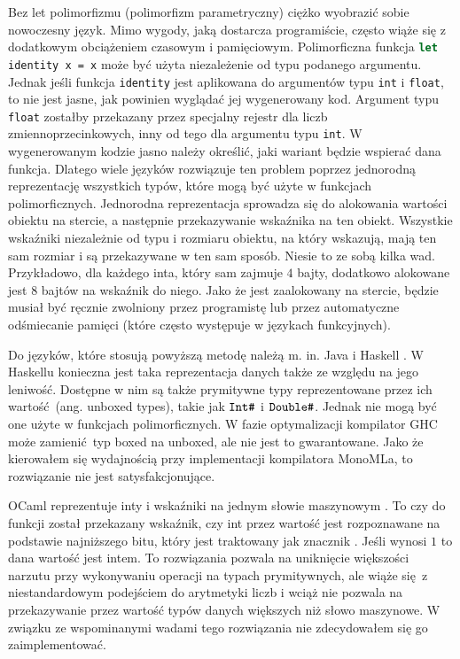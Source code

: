 \documentclass[declaration,shortabstract]{iithesis}
\begin{document}
Bez let polimorfizmu (polimorfizm parametryczny) ciężko wyobrazić sobie 
nowoczesny język. 
Mimo wygody, jaką dostarcza programiście, często wiąże się z dodatkowym
obciążeniem czasowym i pamięciowym. Polimorficzna funkcja  \newline
\lstinline[language=Caml]!let identity x = x! może być użyta niezależenie
od typu podanego argumentu. Jednak jeśli funkcja \texttt{identity} 
jest aplikowana do argumentów typu \texttt{int} i \texttt{float}, to nie jest 
jasne, jak powinien wyglądać jej wygenerowany kod. Argument typu \texttt{float}
zostałby przekazany przez specjalny rejestr dla liczb zmiennoprzecinkowych, 
inny od tego dla argumentu typu \texttt{int}. W wygenerowanym kodzie jasno
należy określić, jaki wariant będzie wspierać dana funkcja. Dlatego wiele 
języków rozwiązuje ten problem poprzez jednorodną reprezentację wszystkich 
typów, które mogą być użyte w funkcjach polimorficznych. Jednorodna 
reprezentacja sprowadza się do alokowania wartości obiektu na stercie, a 
następnie przekazywanie wskaźnika na ten obiekt. Wszystkie wskaźniki 
niezależnie od typu i rozmiaru obiektu, na który wskazują, mają ten sam 
rozmiar i są przekazywane w ten sam sposób. Niesie to ze sobą kilka wad.
Przykładowo, dla każdego inta, który sam zajmuje $4$ bajty,
dodatkowo alokowane jest $8$ bajtów na wskaźnik do niego. Jako że jest 
zaalokowany na stercie, będzie musiał być ręcznie zwolniony przez programistę 
lub przez automatyczne odśmiecanie pamięci (które często występuje w językach 
funkcyjnych).

 
Do języków, które stosują powyższą metodę należą m. in. Java 
\cite{type_erasure} i Haskell 
\cite[Haskell implementation]{haskell_poly}.
W Haskellu konieczna jest taka reprezentacja danych także ze względu na jego 
leniwość. Dostępne w nim są także prymitywne typy reprezentowane przez 
ich wartość (ang. unboxed types), takie jak $\verb!Int#!$ i 
$\verb!Double#!$. Jednak nie mogą być one użyte w funkcjach polimorficznych. 
W fazie optymalizacji kompilator GHC może zamienić typ boxed 
na unboxed, ale nie jest to gwarantowane. Jako że kierowałem się wydajnością
przy implementacji kompilatora MonoMLa, to rozwiązanie nie jest 
satysfakcjonujące.

OCaml reprezentuje inty i wskaźniki na jednym słowie 
maszynowym \cite{levity_polymorphism}. 
To czy do funkcji został przekazany wskaźnik, czy int
przez wartość jest rozpoznawane na podstawie najniższego bitu, który jest 
traktowany jak znacznik \cite[Chapter 20]{real_ocaml}.
Jeśli wynosi $1$ to dana wartość jest intem.
To rozwiązania pozwala na uniknięcie większości narzutu przy wykonywaniu 
operacji na typach prymitywnych, ale wiąże się z niestandardowym podejściem do 
arytmetyki liczb i wciąż nie pozwala na przekazywanie przez wartość typów danych 
większych niż słowo maszynowe. W związku ze wspominanymi wadami tego 
rozwiązania nie zdecydowałem się go zaimplementować.
\end{document}
